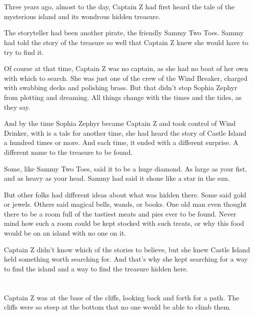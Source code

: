 \documentclass[12pt]{extbook}
\begin{document}
  \section{}\label{section-13}
  
  Three years ago, almost to the day, Captain Z had first heard the tale
  of the mysterious island and its wondrous hidden treasure.
  
  The storyteller had been another pirate, the friendly Sammy Two Toes.
  Sammy had told the story of the treasure so well that Captain Z knew she
  would have to try to find it.
  
  Of course at that time, Captain Z was no captain, as she had no boat of
  her own with which to search. She was just one of the crew of the Wind
  Breaker, charged with swabbing decks and polishing brass. But that
  didn't stop Sophia Zephyr from plotting and dreaming. All things change
  with the times and the tides, as they say.
  
  And by the time Sophia Zephyr became Captain Z and took control of Wind
  Drinker, with is a tale for another time, she had heard the story of
  Castle Island a hundred times or more. And each time, it ended with a
  different surprise. A different name to the treasure to be found.
  
  Some, like Sammy Two Toes, said it to be a huge diamond. As large as
  your fist, and as heavy as your head. Sammy had said it shone like a
  star in the sun.
  
  But other folks had different ideas about what was hidden there. Some
  said gold or jewels. Others said magical bells, wands, or books. One old
  man even thought there to be a room full of the tastiest meats and pies
  ever to be found. Never mind how such a room could be kept stocked with
  such treats, or why this food would be on an island with no one on it.
  
  Captain Z didn't know which of the stories to believe, but she knew
  Castle Island held something worth searching for. And that's why she
  kept searching for a way to find the island and a way to find the
  treasure hidden here.
  
  \section{}\label{section-14}
  
  Captain Z was at the base of the cliffs, looking back and forth for a
  path. The cliffs were so steep at the bottom that no one would be able
  to climb them.
  
\end{document}
